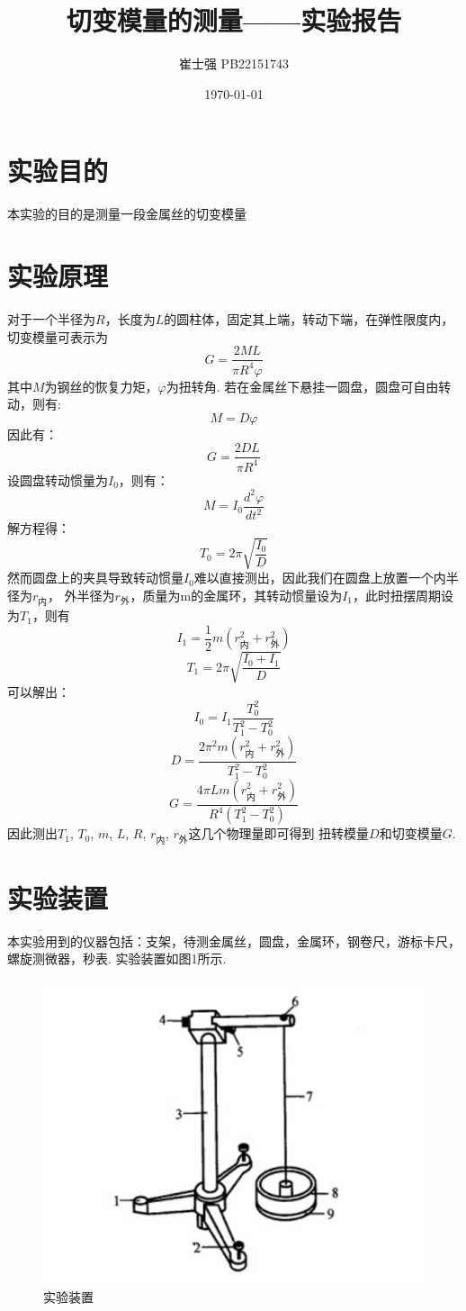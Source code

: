 \documentclass[UTF8]{ctexart}
\title{切变模量的测量——实验报告}
\author{崔士强 PB22151743}
\date{\today}
\begin{document}
\maketitle

\section{实验目的}
本实验的目的是测量一段金属丝的切变模量
\section{实验原理}
对于一个半径为$R$，长度为$L$的圆柱体，固定其上端，转动下端，在弹性限度内，切变模量可表示为
\[G=\frac{2ML}{\pi R^4\varphi }\]
其中$M$为钢丝的恢复力矩，$\varphi$为扭转角.
若在金属丝下悬挂一圆盘，圆盘可自由转动，则有:
\[M=D\varphi\]
因此有：
\[G=\frac{2DL}{\pi R^4}\]
设圆盘转动惯量为$I_0$，则有：
\[M=I_0\frac{d^2\varphi}{dt^2}\]
解方程得：
\[T_0=2\pi \sqrt{\frac{I_0}{D}}\]
然而圆盘上的夹具导致转动惯量$I_0$难以直接测出，因此我们在圆盘上放置一个内半径为$r_\text{内}$，
外半径为$r_\text{外}$，质量为m的金属环，其转动惯量设为$I_1$，此时扭摆周期设为$T_1$，则有
\[I_1=\frac{1}{2}m\left(r_\text{内}^2+r_\text{外}^2\right)\]
\[T_1=2\pi \sqrt{\frac{I_0+I_1}{D}}\]
可以解出：
\[I_0=I_1\frac{T_0^2}{T_1^2-T_0^2}\]
\[D=\frac{2\pi^2m\left(r_\text{内}^2+r_\text{外}^2\right)}{T_1^2-T_0^2}\]
\[G=\frac{4\pi Lm\left(r_\text{内}^2+r_\text{外}^2\right)}{R^4\left(T_1^2-T_0^2\right)}\]
因此测出$T_1$, $T_0$, $m$, $L$, $R$, $r_\text{内}$, $r_\text{外}$这几个物理量即可得到
扭转模量$D$和切变模量$G$.
\section{实验装置}
本实验用到的仪器包括：支架，待测金属丝，圆盘，金属环，钢卷尺，游标卡尺，螺旋测微器，秒表. 
实验装置如图1所示.
\begin{figure}[h]
    \centering
    \includegraphics[scale=0.5]{装置.png}
    \caption{实验装置}
\end{figure}
\clearpage
\end{document}
